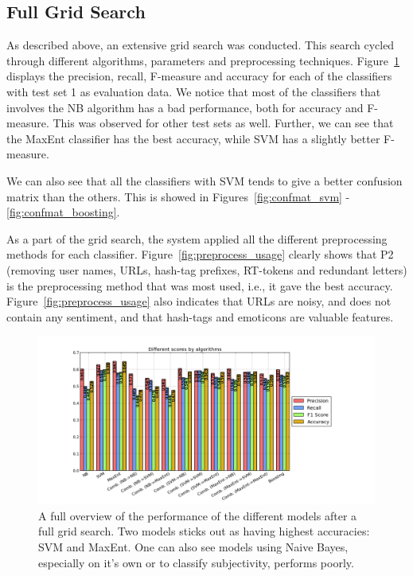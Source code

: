 \subsection{Full Grid Search}
As described above, an extensive grid search was conducted. This search cycled through different algorithms, parameters and preprocessing techniques. Figure~\ref{fig:results_full} displays the precision, recall, F-measure and accuracy for each of the classifiers with test set 1 as evaluation data. We notice that most of the classifiers that involves the NB algorithm has a bad performance, both for accuracy and F-measure. This was observed for other test sets as well. Further, we can see that the MaxEnt classifier has the best accuracy, while SVM has a slightly better F-measure.

We can also see that all the classifiers with SVM tends to give a better confusion matrix than the others. This is showed in Figures~\ref{fig:confmat_svm} - \ref{fig:confmat_boosting}.

As a part of the grid search, the system applied all the different preprocessing methods for each classifier. Figure~\ref{fig:preprocess_usage} clearly shows that P2 (removing user names, URLs, hash-tag prefixes, RT-tokens and redundant letters) is the preprocessing method that was most used, i.e., it gave the best accuracy. Figure~\ref{fig:preprocess_usage} also indicates that URLs are noisy, and does not contain any sentiment, and that hash-tags and emoticons are valuable features.


\begin{figure}
 \begin{center}
     \includegraphics[width=\linewidth]{../img/plots/grid/full.png}
 \end{center}
 \caption[Results overview across models]{A full overview of the performance of the different models after a full grid search. Two models sticks out as having highest accuracies: SVM and MaxEnt. One can also see models using Naive Bayes, especially on it's own or to classify subjectivity, performs poorly.}
 \label{fig:results_full}
\end{figure}



